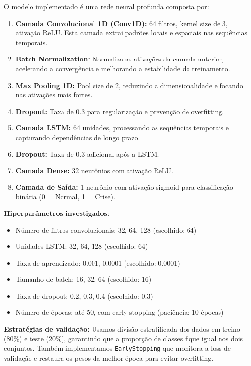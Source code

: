 \documentclass[12pt,a4paper]{article}
\begin{document}
O modelo implementado é uma rede neural profunda composta por:
\begin{enumerate}
    \item \textbf{Camada Convolucional 1D (Conv1D):} 64 filtros, kernel size de 3, ativação ReLU. Esta camada extrai padrões locais e espaciais nas sequências temporais.
    \item \textbf{Batch Normalization:} Normaliza as ativações da camada anterior, acelerando a convergência e melhorando a estabilidade do treinamento.
    \item \textbf{Max Pooling 1D:} Pool size de 2, reduzindo a dimensionalidade e focando nas ativações mais fortes.
    \item \textbf{Dropout:} Taxa de 0.3 para regularização e prevenção de overfitting.
    \item \textbf{Camada LSTM:} 64 unidades, processando as sequências temporais e capturando dependências de longo prazo.
    \item \textbf{Dropout:} Taxa de 0.3 adicional após a LSTM.
    \item \textbf{Camada Dense:} 32 neurônios com ativação ReLU.
    \item \textbf{Camada de Saída:} 1 neurônio com ativação sigmoid para classificação binária (0 = Normal, 1 = Crise).
\end{enumerate}

\textbf{Hiperparâmetros investigados:}
\begin{itemize}
    \item Número de filtros convolucionais: 32, 64, 128 (escolhido: 64)
    \item Unidades LSTM: 32, 64, 128 (escolhido: 64)
    \item Taxa de aprendizado: 0.001, 0.0001 (escolhido: 0.0001)
    \item Tamanho de batch: 16, 32, 64 (escolhido: 16)
    \item Taxa de dropout: 0.2, 0.3, 0.4 (escolhido: 0.3)
    \item Número de épocas: até 50, com early stopping (paciência: 10 épocas)
\end{itemize}

\textbf{Estratégias de validação:} Usamos divisão estratificada dos dados em treino (80\%) e teste (20\%), garantindo que a proporção de classes fique igual nos dois conjuntos. Também implementamos \texttt{EarlyStopping} que monitora a loss de validação e restaura os pesos da melhor época para evitar overfitting.
\end{document}
